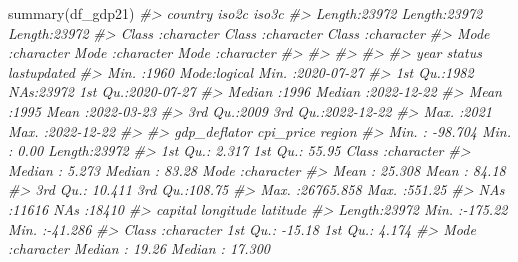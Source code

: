\documentclass[
]{bxjsbook}
\newenvironment{Shaded}{\begin{snugshade}}{\end{snugshade}}
\newcommand{\CommentTok}[1]{\textcolor[rgb]{0.56,0.35,0.01}{\textit{#1}}}
\newcommand{\FunctionTok}[1]{\textcolor[rgb]{0.00,0.00,0.00}{#1}}
\newcommand{\NormalTok}[1]{#1}
\theoremstyle{definition}
\theoremstyle{definition}
\theoremstyle{definition}
\theoremstyle{definition}
\theoremstyle{remark}
\begin{document}
\begin{Shaded}
\begin{Highlighting}[]
\FunctionTok{summary}\NormalTok{(df\_gdp21)}
\CommentTok{\#\textgreater{}    country             iso2c              iso3c          }
\CommentTok{\#\textgreater{}  Length:23972       Length:23972       Length:23972      }
\CommentTok{\#\textgreater{}  Class :character   Class :character   Class :character  }
\CommentTok{\#\textgreater{}  Mode  :character   Mode  :character   Mode  :character  }
\CommentTok{\#\textgreater{}                                                          }
\CommentTok{\#\textgreater{}                                                          }
\CommentTok{\#\textgreater{}                                                          }
\CommentTok{\#\textgreater{}                                                          }
\CommentTok{\#\textgreater{}       year       status         lastupdated        }
\CommentTok{\#\textgreater{}  Min.   :1960   Mode:logical   Min.   :2020{-}07{-}27  }
\CommentTok{\#\textgreater{}  1st Qu.:1982   NA\textquotesingle{}s:23972     1st Qu.:2020{-}07{-}27  }
\CommentTok{\#\textgreater{}  Median :1996                  Median :2022{-}12{-}22  }
\CommentTok{\#\textgreater{}  Mean   :1995                  Mean   :2022{-}03{-}23  }
\CommentTok{\#\textgreater{}  3rd Qu.:2009                  3rd Qu.:2022{-}12{-}22  }
\CommentTok{\#\textgreater{}  Max.   :2021                  Max.   :2022{-}12{-}22  }
\CommentTok{\#\textgreater{}                                                    }
\CommentTok{\#\textgreater{}   gdp\_deflator         cpi\_price         region         }
\CommentTok{\#\textgreater{}  Min.   :  {-}98.704   Min.   :  0.00   Length:23972      }
\CommentTok{\#\textgreater{}  1st Qu.:    2.317   1st Qu.: 55.95   Class :character  }
\CommentTok{\#\textgreater{}  Median :    5.273   Median : 83.28   Mode  :character  }
\CommentTok{\#\textgreater{}  Mean   :   25.308   Mean   : 84.18                     }
\CommentTok{\#\textgreater{}  3rd Qu.:   10.411   3rd Qu.:108.75                     }
\CommentTok{\#\textgreater{}  Max.   :26765.858   Max.   :551.25                     }
\CommentTok{\#\textgreater{}  NA\textquotesingle{}s   :11616       NA\textquotesingle{}s   :18410                      }
\CommentTok{\#\textgreater{}    capital            longitude          latitude      }
\CommentTok{\#\textgreater{}  Length:23972       Min.   :{-}175.22   Min.   :{-}41.286  }
\CommentTok{\#\textgreater{}  Class :character   1st Qu.: {-}15.18   1st Qu.:  4.174  }
\CommentTok{\#\textgreater{}  Mode  :character   Median :  19.26   Median : 17.300  }

\end{Highlighting}
\end{Shaded}
\end{document}
